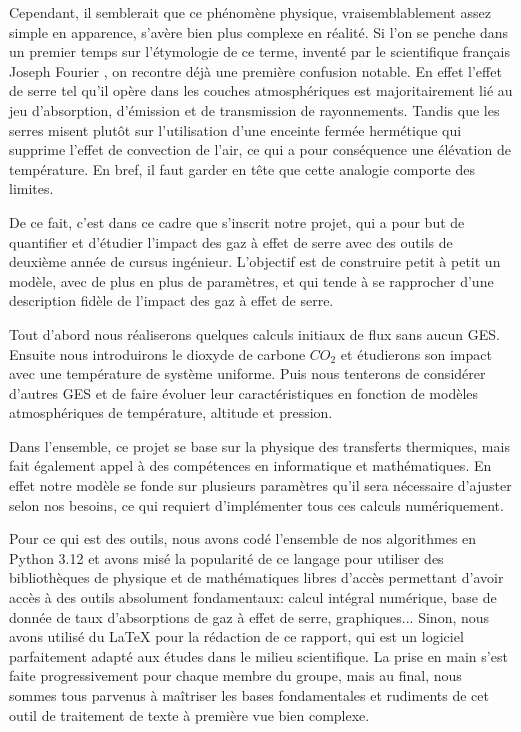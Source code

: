 \documentclass[a4paper, 12pt]{report} %
\begin{document}
\indent Cependant, il semblerait que ce phénomène physique, vraisemblablement assez simple 
en apparence, s'avère bien plus complexe en réalité. Si l'on se penche dans un premier temps sur 
l'étymologie de ce terme, inventé par le scientifique français Joseph Fourier
,
on recontre déjà une première confusion notable. En effet l'effet de serre 
tel qu'il opère dans les couches atmosphériques est majoritairement lié au jeu d'absorption, d'émission 
et de transmission de rayonnements. Tandis que les serres misent plutôt sur l'utilisation d'une enceinte 
fermée hermétique qui supprime l'effet de convection de l'air, ce qui a pour conséquence une élévation 
de température. En bref, il faut garder en tête que cette analogie comporte des limites. \vspace{\baselineskip}

\indent De ce fait, c'est dans ce cadre que s'inscrit notre projet, qui a pour but de quantifier et d'étudier
l'impact des gaz à effet de serre avec des outils de deuxième année de cursus ingénieur. L'objectif est 
de construire petit à petit un modèle, avec de plus en plus de paramètres, et qui tende à se rapprocher
d'une description fidèle de l'impact des gaz à effet de serre. \vspace{\baselineskip}

\indent Tout d'abord nous réaliserons quelques calculs initiaux de flux sans aucun GES.
Ensuite nous introduirons le dioxyde de carbone $CO_2$ et étudierons son impact avec une température de
système uniforme. Puis nous tenterons de considérer d'autres GES et de faire évoluer leur caractéristiques
en fonction de modèles atmosphériques de température, altitude et pression. \vspace{\baselineskip}

\indent Dans l'ensemble, ce projet se base sur la physique des transferts thermiques, 
mais fait également appel à des compétences en informatique et mathématiques.
En effet notre modèle se fonde sur plusieurs paramètres qu'il sera nécessaire
d'ajuster selon nos besoins, ce qui requiert d'implémenter tous ces calculs
numériquement. \vspace{\baselineskip}

\indent Pour ce qui est des outils, nous avons codé l'ensemble de nos algorithmes en Python 3.12 et avons misé
la popularité de ce langage pour utiliser des bibliothèques de physique et de mathématiques libres d'accès
permettant d'avoir accès à des outils absolument fondamentaux: calcul intégral numérique, 
base de donnée de taux d'absorptions de gaz à effet de serre, graphiques... Sinon, nous avons utilisé du \LaTeX
pour la rédaction de ce rapport, qui est un logiciel parfaitement adapté aux études dans le milieu scientifique.
La prise en main s'est faite progressivement pour chaque membre du groupe, mais au final, nous sommes tous parvenus
à maîtriser les bases fondamentales et rudiments de cet outil de traitement de texte à première vue bien complexe.
\end{document}

